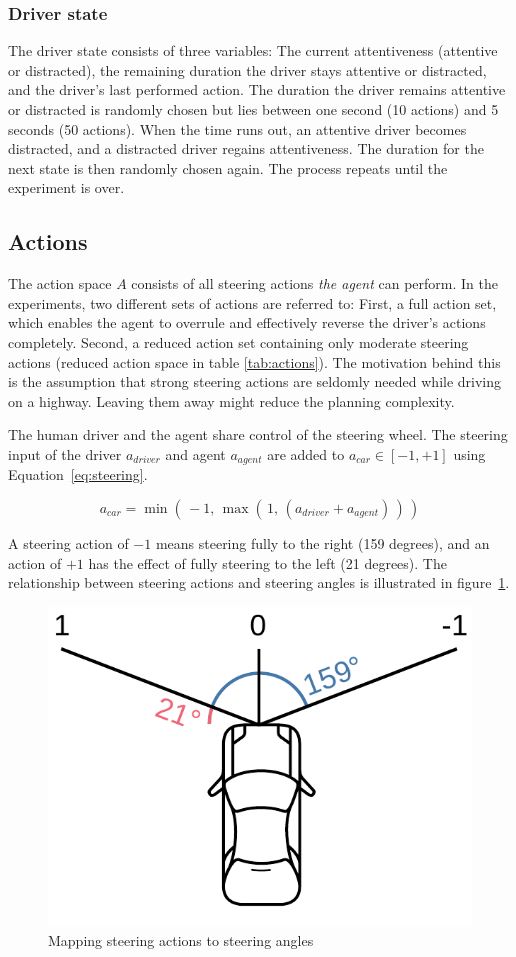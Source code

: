 \subsubsection*{Driver state}
\label{sec:driver_state}
The driver state consists of three variables: The current attentiveness (attentive or distracted), the remaining duration the driver stays attentive or distracted, and the driver's last performed action. The duration the driver remains attentive or distracted is randomly chosen but lies between one second (10 actions) and 5 seconds (50 actions). When the time runs out, an attentive driver becomes distracted, and a distracted driver regains attentiveness. The duration for the next state is then randomly chosen again. The process repeats until the experiment is over.

\subsection{Actions}
\label{sec:actions}

The action space $A$ consists of all steering actions \emph{the agent} can perform. In the experiments, two different sets of actions are referred to: First, a full action set, which enables the agent to overrule and effectively reverse the driver's actions completely. Second, a reduced action set containing only moderate steering actions (reduced action space in table \ref{tab:actions}). The motivation behind this is the assumption that strong steering actions are seldomly needed while driving on a highway. Leaving them away might reduce the planning complexity.

The human driver and the agent share control of the steering wheel. The steering input of the driver $a_{driver}$ and agent $a_{agent}$ are added to $a_{car} \in [-1, +1]$ using Equation~\ref{eq:steering}.

\begin{equation}
    a_{car} = \min(\, -1, \, \max(\, 1, \, (a_{driver} + a_{agent})\,)\,)
    \label{eq:steering}
\end{equation}

A steering action of $-1$ means steering fully to the right (159 degrees), and an action of $+1$ has the effect of fully steering to the left (21 degrees). The relationship between steering actions and steering angles is illustrated in figure~\ref{fig:steer-angle}.

\begin{figure}[htbp]
    \includegraphics[width=0.3\linewidth]{figures/steering-angle.pdf}
    \centering
    \caption{Mapping steering actions to steering angles}
    \label{fig:steer-angle}
\end{figure}

